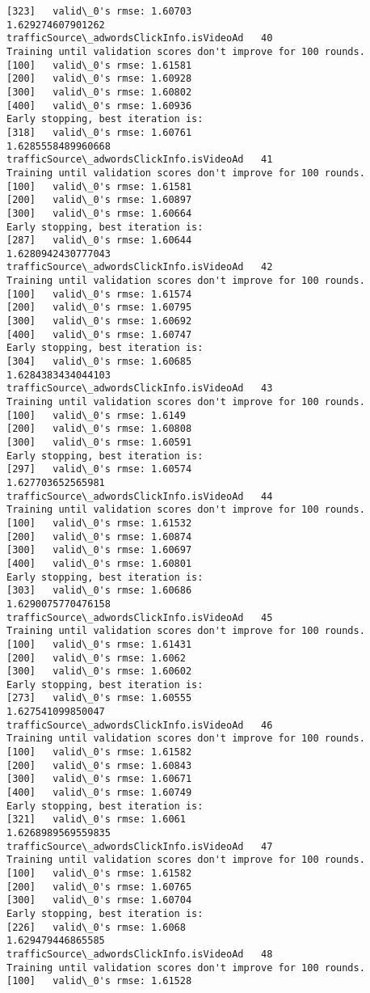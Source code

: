 \documentclass[11pt]{article}
\begin{document}
\begin{Verbatim}[commandchars=\\\{\}]
[323]	valid\_0's rmse: 1.60703
1.629274607901262
trafficSource\_adwordsClickInfo.isVideoAd   40
Training until validation scores don't improve for 100 rounds.
[100]	valid\_0's rmse: 1.61581
[200]	valid\_0's rmse: 1.60928
[300]	valid\_0's rmse: 1.60802
[400]	valid\_0's rmse: 1.60936
Early stopping, best iteration is:
[318]	valid\_0's rmse: 1.60761
1.6285558489960668
trafficSource\_adwordsClickInfo.isVideoAd   41
Training until validation scores don't improve for 100 rounds.
[100]	valid\_0's rmse: 1.61581
[200]	valid\_0's rmse: 1.60897
[300]	valid\_0's rmse: 1.60664
Early stopping, best iteration is:
[287]	valid\_0's rmse: 1.60644
1.6280942430777043
trafficSource\_adwordsClickInfo.isVideoAd   42
Training until validation scores don't improve for 100 rounds.
[100]	valid\_0's rmse: 1.61574
[200]	valid\_0's rmse: 1.60795
[300]	valid\_0's rmse: 1.60692
[400]	valid\_0's rmse: 1.60747
Early stopping, best iteration is:
[304]	valid\_0's rmse: 1.60685
1.6284383434044103
trafficSource\_adwordsClickInfo.isVideoAd   43
Training until validation scores don't improve for 100 rounds.
[100]	valid\_0's rmse: 1.6149
[200]	valid\_0's rmse: 1.60808
[300]	valid\_0's rmse: 1.60591
Early stopping, best iteration is:
[297]	valid\_0's rmse: 1.60574
1.627703652565981
trafficSource\_adwordsClickInfo.isVideoAd   44
Training until validation scores don't improve for 100 rounds.
[100]	valid\_0's rmse: 1.61532
[200]	valid\_0's rmse: 1.60874
[300]	valid\_0's rmse: 1.60697
[400]	valid\_0's rmse: 1.60801
Early stopping, best iteration is:
[303]	valid\_0's rmse: 1.60686
1.6290075770476158
trafficSource\_adwordsClickInfo.isVideoAd   45
Training until validation scores don't improve for 100 rounds.
[100]	valid\_0's rmse: 1.61431
[200]	valid\_0's rmse: 1.6062
[300]	valid\_0's rmse: 1.60602
Early stopping, best iteration is:
[273]	valid\_0's rmse: 1.60555
1.627541099850047
trafficSource\_adwordsClickInfo.isVideoAd   46
Training until validation scores don't improve for 100 rounds.
[100]	valid\_0's rmse: 1.61582
[200]	valid\_0's rmse: 1.60843
[300]	valid\_0's rmse: 1.60671
[400]	valid\_0's rmse: 1.60749
Early stopping, best iteration is:
[321]	valid\_0's rmse: 1.6061
1.6268989569559835
trafficSource\_adwordsClickInfo.isVideoAd   47
Training until validation scores don't improve for 100 rounds.
[100]	valid\_0's rmse: 1.61582
[200]	valid\_0's rmse: 1.60765
[300]	valid\_0's rmse: 1.60704
Early stopping, best iteration is:
[226]	valid\_0's rmse: 1.6068
1.629479446865585
trafficSource\_adwordsClickInfo.isVideoAd   48
Training until validation scores don't improve for 100 rounds.
[100]	valid\_0's rmse: 1.61528

\end{Verbatim}
\end{document}
